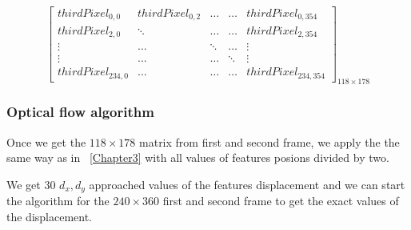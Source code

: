 \[
\begin{bmatrix}

thirdPixel_{0,0} & thirdPixel_{0,2} & \ldots & \ldots & thirdPixel_{0,354}\\

thirdPixel_{2,0} & \ddots & \ldots & \ldots & thirdPixel_{2,354}\\

\vdots & \ldots & \ddots & \ldots & \vdots\\

\vdots & \ldots & \ldots & \ddots & \vdots\\

thirdPixel_{234,0} & \ldots & \ldots  & \ldots & thirdPixel_{234,354}

\end{bmatrix}_{118\times 178}
\]

\subsubsection{Optical flow algorithm}

Once we get the $118\times 178$ matrix from first and second frame, we apply the \flow{} the same way as in ~\ref{Chapter3} with all values of features posions divided by two.

We get 30 $d_{x},d_{y}$ approached values of the features displacement and we can start the \flow{} algorithm for the $240\times 360$ first and second frame to get the exact values of the displacement.

